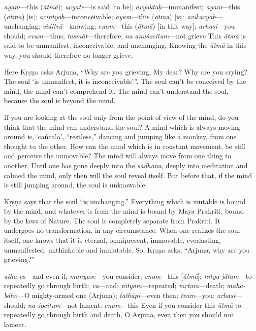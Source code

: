 {%
  \textit{ayam}---this (\textit{ātmā}); 
  \textit{ucyate}---is said [to be]; 
  \textit{avyaktaḥ}---unmanifest; 
  \textit{ayam}---this (\textit{ātmā}) [is]; 
  \textit{acintyaḥ}---inconceivable; 
  \textit{ayam}---this (\textit{ātmā}) [is]; 
  \textit{avikāryaḥ}---unchanging; 
  \textit{viditvā}---knowing; 
  \textit{enam}---this (\textit{ātmā}) [in this way]; 
  \textit{arhasi}---you should; 
  \textit{evam}---thus; 
  \textit{tasmāt}---therefore; 
  \textit{na anuśocitum}---not grieve
}
{%
  This \textit{ātmā} is said to be unmanifest, inconceivable, and unchanging. Knowing the \textit{ātmā} in this way, you should therefore no longer grieve.
}

Here Kṛṣṇa asks Arjuna, “Why are you grieving, My dear? Why are you crying? The soul ‘is unmanifest, it is inconceivable’”. The soul can’t be conceived by the mind, the mind can’t comprehend it. The mind can’t understand the soul, because the soul is beyond the mind.

If you are looking at the soul only from the point of view of the mind, do you think that the mind can understand the soul? A mind which is always moving around is, ‘cañcala’, “restless,” dancing and jumping like a monkey, from one thought to the other. How can the mind which is in constant movement, be still and perceive the unmovable? The mind will always move from one thing to another. Until one has gone deeply into the \textit{sādhana}, deeply into meditation and calmed the mind, only then will the soul reveal itself. But before that, if the mind is still jumping around, the soul is unknowable.

Kṛṣṇa says that the soul “is unchanging.” Everything which is mutable is bound by the mind, and whatever is from the mind is bound by Maya Prakriti, bound by the laws of Nature. The soul is completely separate from Prakriti. It undergoes no transformation, in any circumstance. When one realizes the soul itself, one knows that it is eternal, omnipresent, immovable, everlasting, unmanifested, unthinkable and immutable. So, Kṛṣṇa asks, “Arjuna, why are you grieving?”

{%
  \textit{atha ca}---and even if; 
  \textit{manyase}---you consider; 
  \textit{enam}---this [\textit{ātmā}]; 
  \textit{nitya-jātam}---to repeatedly go through birth; 
  \textit{vā}---and; 
  \textit{nityam}---repeated; 
  \textit{mṛtam}---death; 
  \textit{mahā-bāho}---O mighty-armed one (Arjuna); 
  \textit{tathāpi}---even then; 
  \textit{tvam}---you; 
  \textit{arhasi}---should; 
  \textit{na śocitum}---not lament; 
  \textit{enam}---this
}
{%
  Even if you consider this \textit{ātmā} to repeatedly go through birth and death, O Arjuna, even then you should not lament.
}

